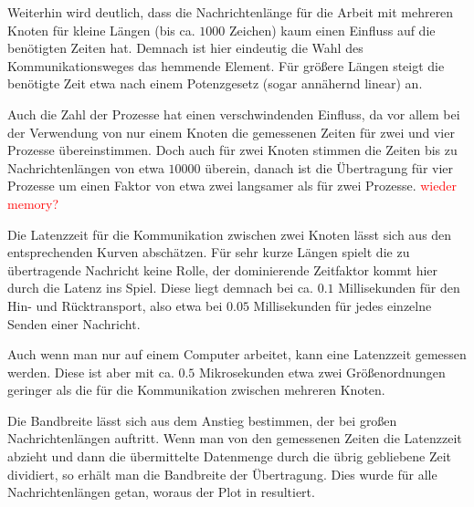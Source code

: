 Weiterhin wird deutlich, dass die Nachrichtenlänge für die Arbeit mit mehreren
Knoten für kleine Längen (bis ca. $1000$ Zeichen) kaum einen Einfluss auf die
benötigten Zeiten hat. Demnach ist hier eindeutig die Wahl des Kommunikationsweges
das hemmende Element. Für größere Längen steigt die benötigte Zeit etwa nach einem 
Potenzgesetz (sogar annähernd linear) an. 

Auch die Zahl der Prozesse hat einen verschwindenden Einfluss, da vor allem bei der
Verwendung von nur einem Knoten die gemessenen Zeiten für zwei und vier Prozesse
übereinstimmen. Doch auch für zwei Knoten stimmen die Zeiten bis zu Nachrichtenlängen 
von etwa $10000$ überein, danach ist die Übertragung für vier Prozesse um einen Faktor
von etwa zwei langsamer als für zwei Prozesse. \textcolor{red}{wieder memory?}

Die Latenzzeit für die Kommunikation zwischen zwei Knoten lässt sich aus den entsprechenden
Kurven abschätzen. Für sehr kurze Längen spielt die zu übertragende Nachricht keine Rolle,
der dominierende Zeitfaktor kommt hier durch die Latenz ins Spiel. Diese liegt demnach bei
ca. $0.1$ Millisekunden für den Hin- und Rücktransport, also etwa bei $0.05$ Millisekunden
für jedes einzelne Senden einer Nachricht.

Auch wenn man nur auf einem Computer arbeitet, kann eine Latenzzeit gemessen werden.
Diese ist aber mit ca. $0.5$ Mikrosekunden etwa zwei Größenordnungen geringer als die
für die Kommunikation zwischen mehreren Knoten.

Die Bandbreite lässt sich aus dem Anstieg bestimmen, der bei großen Nachrichtenlängen
auftritt. Wenn man von den gemessenen Zeiten die Latenzzeit abzieht und dann die
übermittelte Datenmenge durch die übrig gebliebene Zeit dividiert, so erhält man 
die Bandbreite der Übertragung. Dies wurde für alle Nachrichtenlängen getan, woraus
der Plot in  resultiert.

